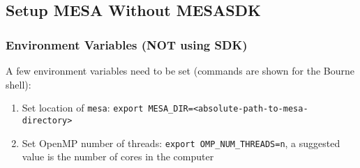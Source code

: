 \subsection{Setup {\sf MESA} Without {\sf MESASDK}}
\label{sec:woSDK}

\subsubsection{Environment Variables (NOT using SDK)}
A few environment variables need to be set (commands are shown for the 
Bourne shell):
\begin{enumerate}
\item Set location of {\tt mesa}: 
{\tt export MESA\_DIR=<absolute-path-to-mesa-directory>}

\item Set OpenMP number of threads: {\tt export OMP\_NUM\_THREADS=n}, a suggested value is the number of cores in the computer
\end{enumerate}

